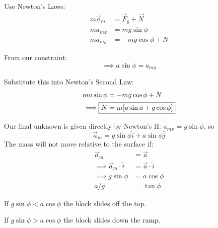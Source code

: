 \documentclass[10pt]{scrartcl}
\begin{document}
\begin{example}
Use Newton's Laws:
\[
\begin{aligned}
  m\vec{a}_m &= \vec{F}_g + \vec{N}\\
  ma_{mx} &= mg\sin\phi\\
  ma_{my} &= -mg\cos\phi + N
\end{aligned}
\]

From our constraint: 
\[\implies a\sin\phi = a_{my}\]

Substitute this into Newton's Second Law: 
\[
\begin{aligned}
  ma\sin\phi &= -mg\cos\phi + N\\
  \implies \Aboxed{N &= m[a\sin\phi + g\cos\phi]}
\end{aligned}
\]

Our final unknown is given directly by Newton's II: $a_{mx} = g\sin\phi$, so
\[\boxed{\vec{a}_m = g\sin\phi \hat{i} + a\sin\phi\hat{j}}\]
The mass will not move relative to the surface if: 
\[
\begin{aligned}
  \vec{a}_m &= \vec{a}\\
  \implies \vec{a}_m\cdot\hat{i} &= \vec{a}\cdot\hat{i}\\
  \implies g\sin\phi &= a\cos\phi\\
  a/g &= \tan\phi 
\end{aligned}
\]

If $g\sin\phi < a\cos\phi$ the block slides off the top. 

If $g\sin\phi > a\cos\phi$ the block slides down the ramp. 

\end{example}\vsp
\end{document}
